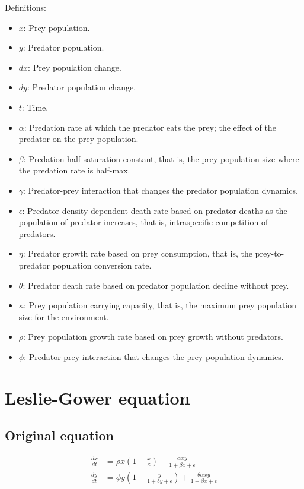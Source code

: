 Definitions:
\begin{itemize}
\item $x$: Prey population.
\item $y$: Predator population.
\item $dx$: Prey population change.
\item $dy$: Predator population change.
\item $t$: Time.
\item $\alpha$: Predation rate at which the predator eats the prey; the effect of the predator on the prey population.
\item $\beta$: Predation half-saturation constant, that is, the prey population size where the predation rate is half-max.
\item $\gamma$: Predator-prey interaction that changes the predator population dynamics.
\item $\epsilon$: Predator density-dependent death rate based on predator deaths as the population of predator increases, that is, intraspecific competition of predators.
\item $\eta$: Predator growth rate based on prey consumption, that is, the prey-to-predator population conversion rate.
\item $\theta$: Predator death rate based on predator population decline without prey.
\item $\kappa$: Prey population carrying capacity, that is, the maximum prey population size for the environment.
\item $\rho$: Prey population growth rate based on prey growth without predators.
\item $\phi$: Predator-prey interaction that changes the prey population dynamics.
\end{itemize}

\section{Leslie-Gower equation}
\subsection{Original equation}
\begin{equation*}
\begin{split}
\frac{dx}{dt} &= \rho x (1 - \frac{x}{\kappa}) - \frac{\alpha xy}{1 + \beta x + \epsilon} \\
\frac{dy}{dt} &= \phi y (1 - \frac{y}{1 + \delta y + \epsilon}) + \frac{\theta \alpha xy}{1 + \beta x + \epsilon}
\end{split}
\end{equation*}

